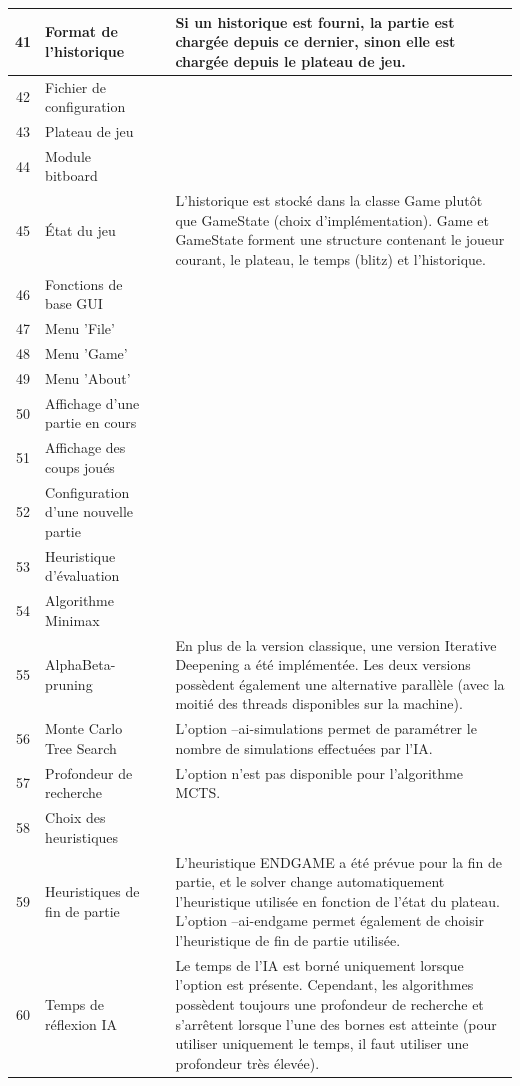 \documentclass{article}
\newcommand{\valid}{\textcolor{green}{\ding{108}}}  %
\begin{document}
\begin{longtable}{|c|p{5cm}|c|p{5cm}|}
    \hline
    41 & Format de l'historique & \valid & Si un historique est fourni, la partie est chargée depuis ce dernier, sinon elle est chargée depuis le plateau de jeu. \\
    \hline
    42 & Fichier de configuration & \valid & \\
    \hline
    43 & Plateau de jeu & \valid & \\
    \hline
    44 & Module bitboard & \valid & \\
    \hline
    45 & État du jeu & \valid & L'historique est stocké dans la classe Game plutôt que GameState (choix d'implémentation).
    Game et GameState forment une structure contenant le joueur courant, le plateau, le temps (blitz) et l'historique.\\
    \hline
    46 & Fonctions de base GUI & \valid & \\
    \hline
    47 & Menu 'File' & \valid & \\
    \hline
    48 & Menu 'Game' & \valid & \\
    \hline
    49 & Menu 'About' & \valid & \\
    \hline
    50 & Affichage d'une partie en cours & \valid & \\
    \hline
    51 & Affichage des coups joués & \valid & \\
    \hline
    52 & Configuration d'une nouvelle partie & \valid & \\
    \hline
    53 & Heuristique d'évaluation & \valid & \\
    \hline
    54 & Algorithme Minimax & \valid & \\
    \hline
    55 & AlphaBeta-pruning & \valid & En plus de la version classique, une version Iterative Deepening a été implémentée. Les deux versions possèdent également une alternative parallèle (avec la moitié des threads disponibles sur la machine). \\
    \hline
    56 & Monte Carlo Tree Search & \valid & L'option --ai-simulations permet de paramétrer le nombre de simulations effectuées par l'IA. \\
    \hline
    57 & Profondeur de recherche & \valid & L'option n'est pas disponible pour l'algorithme MCTS. \\
    \hline
    58 & Choix des heuristiques & \valid & \\
    \hline
    59 & Heuristiques de fin de partie & \valid & L'heuristique ENDGAME a été prévue pour la fin de partie, et le solver change automatiquement l'heuristique utilisée en fonction de l'état du plateau. L'option --ai-endgame permet également de choisir l'heuristique de fin de partie utilisée. \\
    \hline
    60 & Temps de réflexion IA & \valid & Le temps de l'IA est borné uniquement lorsque l'option est présente. Cependant, les algorithmes possèdent toujours une profondeur de recherche et s'arrêtent lorsque l'une des bornes est atteinte (pour utiliser uniquement le temps, il faut utiliser une profondeur très élevée). \\
    \hline
\end{longtable}
\end{document}
